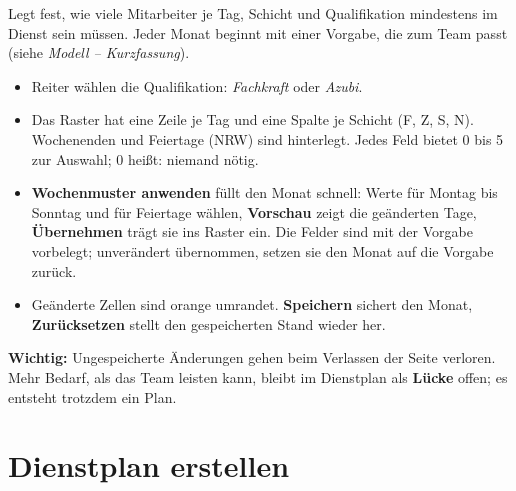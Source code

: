 \documentclass[11pt]{combiArticle}
\newcommand{\knopf}[1]{\textbf{#1}}
\begin{document}
Legt fest, wie viele Mitarbeiter je Tag, Schicht und Qualifikation mindestens im Dienst sein müssen. Jeder Monat
beginnt mit einer Vorgabe, die zum Team passt (siehe \emph{Modell -- Kurzfassung}).
\begin{itemize}
  \item Reiter wählen die Qualifikation: \emph{Fachkraft} oder \emph{Azubi}.
  \item Das Raster hat eine Zeile je Tag und eine Spalte je Schicht (F, Z, S, N). Wochenenden und Feiertage
        (NRW) sind hinterlegt. Jedes Feld bietet 0 bis 5 zur Auswahl; 0 heißt: niemand nötig.
  \item \textbf{Wochenmuster anwenden} füllt den Monat schnell: Werte für Montag bis Sonntag und für Feiertage
        wählen, \knopf{Vorschau} zeigt die geänderten Tage, \knopf{Übernehmen} trägt sie ins Raster ein. Die
        Felder sind mit der Vorgabe vorbelegt; unverändert übernommen, setzen sie den Monat auf die Vorgabe zurück.
  \item Geänderte Zellen sind orange umrandet. \knopf{Speichern} sichert den Monat, \knopf{Zurücksetzen} stellt
        den gespeicherten Stand wieder her.
\end{itemize}
\textbf{Wichtig:} Ungespeicherte Änderungen gehen beim Verlassen der Seite verloren. Mehr Bedarf, als das Team
leisten kann, bleibt im Dienstplan als \textbf{Lücke} offen; es entsteht trotzdem ein Plan.

\section{Dienstplan erstellen}\label{sec:erstellen}
\end{document}
